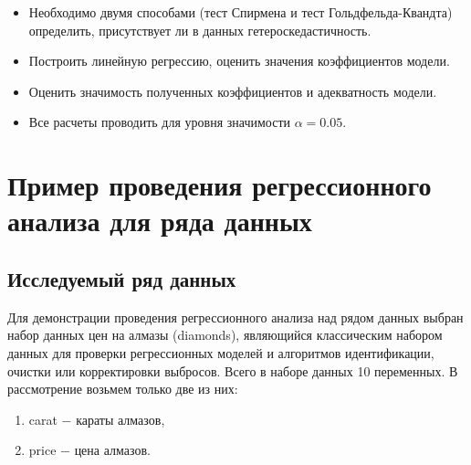\documentclass[
]{article}
\begin{document}
\begin{itemize}
\item
  Необходимо двумя способами (тест Спирмена и тест Гольдфельда-Квандта)
  определить, присутствует ли в данных гетероскедастичность.
\item
  Построить линейную регрессию, оценить значения коэффициентов модели.
\item
  Оценить значимость полученных коэффициентов и адекватность модели.
\item
  Все расчеты проводить для уровня значимости \(\alpha = 0.05\).
\end{itemize}

\hypertarget{ux43fux440ux438ux43cux435ux440-ux43fux440ux43eux432ux435ux434ux435ux43dux438ux44f-ux440ux435ux433ux440ux435ux441ux441ux438ux43eux43dux43dux43eux433ux43e-ux430ux43dux430ux43bux438ux437ux430-ux434ux43bux44f-ux440ux44fux434ux430-ux434ux430ux43dux43dux44bux445}{%
\section{\texorpdfstring{\textbf{Пример проведения регрессионного
анализа для ряда
данных}}{Пример проведения регрессионного анализа для ряда данных}}\label{ux43fux440ux438ux43cux435ux440-ux43fux440ux43eux432ux435ux434ux435ux43dux438ux44f-ux440ux435ux433ux440ux435ux441ux441ux438ux43eux43dux43dux43eux433ux43e-ux430ux43dux430ux43bux438ux437ux430-ux434ux43bux44f-ux440ux44fux434ux430-ux434ux430ux43dux43dux44bux445}}

\hypertarget{ux438ux441ux441ux43bux435ux434ux443ux435ux43cux44bux439-ux440ux44fux434-ux434ux430ux43dux43dux44bux445}{%
\subsection{\texorpdfstring{\textbf{Исследуемый ряд
данных}}{Исследуемый ряд данных}}\label{ux438ux441ux441ux43bux435ux434ux443ux435ux43cux44bux439-ux440ux44fux434-ux434ux430ux43dux43dux44bux445}}

Для демонстрации проведения регрессионного анализа над рядом данных
выбран набор данных цен на алмазы (diamonds), являющийся классическим
набором данных для проверки регрессионных моделей и алгоритмов
идентификации, очистки или корректировки выбросов. Всего в наборе данных
10 переменных. В рассмотрение возьмем только две из них:

\begin{enumerate}
\def\labelenumi{\arabic{enumi}.}
\item
  carat \(-\) караты алмазов,
\item
  price \(-\) цена алмазов.
\end{enumerate}
\end{document}
